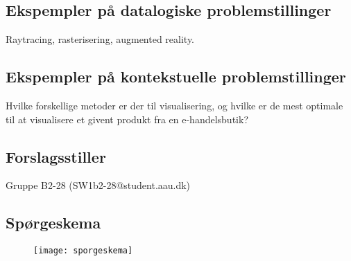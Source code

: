 \subsection*{Ekspempler på datalogiske problemstillinger}
Raytracing, rasterisering, augmented reality.

\subsection*{Ekspempler på kontekstuelle problemstillinger}
Hvilke forskellige metoder er der til visualisering, og hvilke er de mest optimale til at visualisere et givent produkt fra en e-handelsbutik?

\subsection*{Forslagsstiller}
Gruppe B2-28 (SW1b2-28@student.aau.dk)

\subsection{Spørgeskema}
\label{sec:skema}
\begin{figure}[H]
    \texttt{[image: sporgeskema]}
\end{figure}

